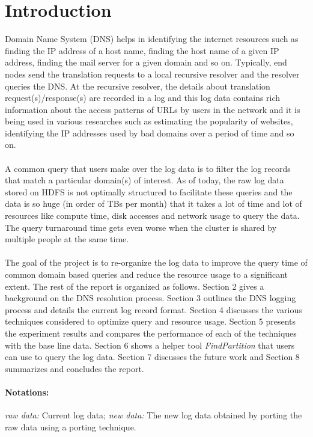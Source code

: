 \documentclass[11pt,a4paper]{article}
\begin{document}
\section {Introduction}
Domain Name System (DNS) helps in identifying the internet resources such as finding the IP address of a host name, finding the host name of a given IP address, finding the mail server for a given domain and so on. Typically, end nodes send the translation requests to a local recursive resolver and the resolver queries the DNS. At the recursive resolver, the details about translation request(s)/response(s) are recorded in a log and this log data contains rich information about the access patterns of URLs by users in the network and it is being used in various researches such as estimating the popularity of websites\cite{peekingcloud}, identifying the IP addresses used by bad domains over a period of time and so on.
\\\\
A common query that users make over the log data is to filter the log records that match a particular domain(s) of interest. As of today, the raw log data stored on HDFS is not optimally structured to facilitate these queries and the data is so huge (in order of TBs per month) that it takes a lot of time and lot of resources like compute time, disk accesses and network usage to query the data. The query turnaround time gets even worse when the cluster is shared by multiple people at the same time.
\\\\
The goal of the project is to re-organize the log data to improve the query time of common domain based queries and reduce the resource usage to a significant extent. The rest of the report is organized as follows. Section 2 gives a background on the DNS resolution process. Section 3 outlines the DNS logging process and details the current log record format. Section 4 discusses the various techniques considered to optimize query and resource usage. Section 5 presents the experiment results and compares the performance of each of the techniques with the base line data. Section 6 shows a helper tool \textit{FindPartition} that users can use to query the log data. Section 7 discusses the future work and Section 8 summarizes and concludes the report.

\paragraph{Notations:} \textit{raw data: }Current log data; \textit{new data: }The new log data obtained by porting the raw data using a porting technique.
\end{document}
